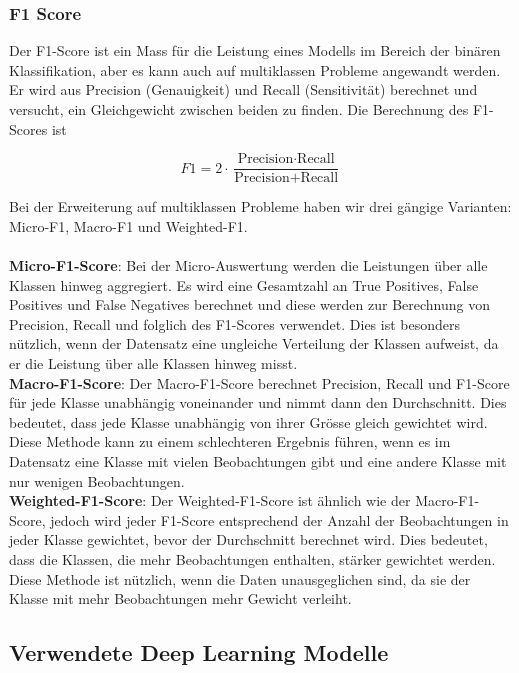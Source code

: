 \documentclass{article}
\begin{document}
\newpage

\subsubsection{F1 Score}
Der F1-Score ist ein Mass für die Leistung eines Modells im Bereich der binären Klassifikation, aber es kann auch auf multiklassen Probleme angewandt werden. Er wird aus Precision (Genauigkeit) und Recall (Sensitivität) berechnet und versucht, ein Gleichgewicht zwischen beiden zu finden. Die Berechnung des F1-Scores ist 

\begin{equation}
F1 = 2 \cdot \frac{{\text{{Precision}} \cdot \text{{Recall}}}}{{\text{{Precision}} + \text{{Recall}}}}
\end{equation}
 
Bei der Erweiterung auf multiklassen Probleme haben wir drei gängige Varianten: Micro-F1, Macro-F1 und Weighted-F1.\\\\
\textbf{Micro-F1-Score}: Bei der Micro-Auswertung werden die Leistungen über alle Klassen hinweg aggregiert. Es wird eine Gesamtzahl an True Positives, False Positives und False Negatives berechnet und diese werden zur Berechnung von Precision, Recall und folglich des F1-Scores verwendet. Dies ist besonders nützlich, wenn der Datensatz eine ungleiche Verteilung der Klassen aufweist, da er die Leistung über alle Klassen hinweg misst.\\
\textbf{Macro-F1-Score}: Der Macro-F1-Score berechnet Precision, Recall und F1-Score für jede Klasse unabhängig voneinander und nimmt dann den Durchschnitt. Dies bedeutet, dass jede Klasse unabhängig von ihrer Grösse gleich gewichtet wird. Diese Methode kann zu einem schlechteren Ergebnis führen, wenn es im Datensatz eine Klasse mit vielen Beobachtungen gibt und eine andere Klasse mit nur wenigen Beobachtungen.\\
\textbf{Weighted-F1-Score}: Der Weighted-F1-Score ist ähnlich wie der Macro-F1-Score, jedoch wird jeder F1-Score entsprechend der Anzahl der Beobachtungen in jeder Klasse gewichtet, bevor der Durchschnitt berechnet wird. Dies bedeutet, dass die Klassen, die mehr Beobachtungen enthalten, stärker gewichtet werden. Diese Methode ist nützlich, wenn die Daten unausgeglichen sind, da sie der Klasse mit mehr Beobachtungen mehr Gewicht verleiht.

\newpage
\subsection{Verwendete Deep Learning Modelle}
\end{document}
